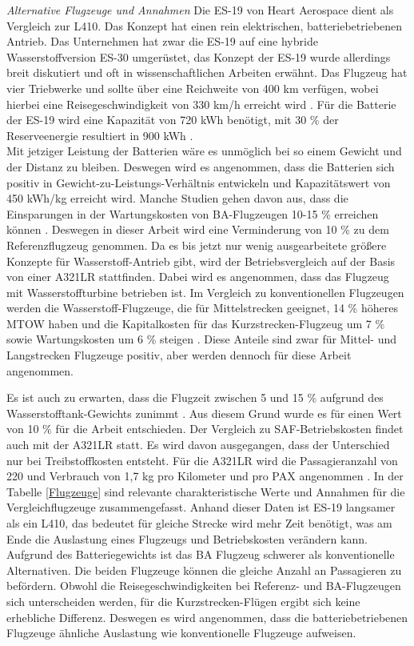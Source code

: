 \textit{Alternative Flugzeuge und Annahmen}
Die ES-19 von Heart Aerospace dient als Vergleich zur L410. Das Konzept hat einen rein elektrischen, batteriebetriebenen Antrieb.
Das Unternehmen hat zwar die ES-19 auf eine hybride Wasserstoffversion ES-30 umgerüstet, das Konzept der ES-19 wurde allerdings breit diskutiert 
und oft in wissenschaftlichen Arbeiten erwähnt. Das Flugzeug hat vier Triebwerke und sollte über eine Reichweite von 400 km verfügen, 
wobei hierbei eine Reisegeschwindigkeit von 330 km/h erreicht wird \cite{anker2023feasibility} \cite{heart_aerospace_es19}.
Für die Batterie der ES-19 wird eine Kapazität von 720 kWh benötigt, mit 30 \% der Reserveenergie resultiert in 900 kWh \cite{donckers2024electric}. \\
Mit jetziger Leistung der Batterien wäre es unmöglich bei so einem Gewicht und der Distanz zu bleiben.
Deswegen wird es angenommen, dass die Batterien sich positiv in Gewicht-zu-Leistungs-Verhältnis entwickeln und Kapazitätswert von 450 kWh/kg erreicht wird.
Manche Studien gehen davon aus, dass die Einsparungen in der Wartungskosten von BA-Flugzeugen 10-15 \% erreichen können 
\cite{wangsness2021fremskyndet,avogadro2024demystifying}. 
Deswegen in dieser Arbeit wird eine Verminderung von 10 \% zu dem Referenzflugzeug genommen.
%
Da es bis jetzt nur wenig ausgearbeitete größere Konzepte für Wasserstoff-Antrieb gibt, wird der Betriebsvergleich
auf der Basis von einer A321LR stattfinden. Dabei wird es angenommen, dass das Flugzeug mit Wasserstoffturbine betrieben ist.
Im Vergleich zu konventionellen Flugzeugen werden die Wasserstoff-Flugzeuge, die für Mittelstrecken geeignet, 14 \% höheres MTOW haben 
und die Kapitalkosten für das Kurzstrecken-Flugzeug um 7 \% sowie Wartungskosten um 6 \% steigen \cite{sky2020hydrogen}. 
Diese Anteile sind zwar für Mittel- und Langstrecken Flugzeuge positiv, aber werden dennoch für diese Arbeit angenommen.

Es ist auch zu erwarten, dass die Flugzeit zwischen 5 und 15 \% aufgrund des Wasserstofftank-Gewichts zunimmt \cite{sky2020hydrogen}. 
Aus diesem Grund wurde es für einen Wert von 10 \% für die Arbeit entschieden.
Der Vergleich zu SAF-Betriebskosten findet auch mit der A321LR statt. Es wird davon ausgegangen, dass der Unterschied 
nur bei Treibstoffkosten entsteht. Für die A321LR wird die Passagieranzahl von 220 und Verbrauch von 1,7 kg pro Kilometer und pro PAX angenommen \cite{fonseca2022doc}.
%
In der Tabelle \ref{Flugzeuge} sind relevante charakteristische Werte und Annahmen für die Vergleichflugzeuge zusammengefasst.
Anhand dieser Daten ist ES-19 langsamer als ein L410, das bedeutet für gleiche Strecke wird mehr Zeit benötigt, was am Ende die Auslastung 
eines Flugzeugs und Betriebskosten verändern kann. Aufgrund des Batteriegewichts ist das BA Flugzeug schwerer als konventionelle Alternativen.
Die beiden Flugzeuge können die gleiche Anzahl an Passagieren zu befördern. 
Obwohl die Reisegeschwindigkeiten bei Referenz- und BA-Flugzeugen sich unterscheiden werden, 
für die Kurzstrecken-Flügen ergibt sich keine erhebliche Differenz.
Deswegen es wird angenommen, dass die batteriebetriebenen Flugzeuge ähnliche Auslastung wie konventionelle Flugzeuge aufweisen.


